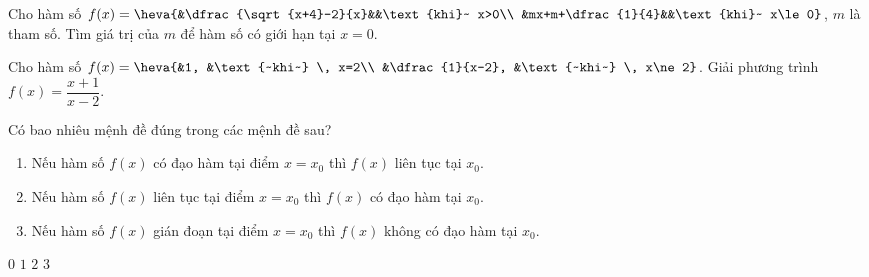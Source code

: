 \begin{ex}%
	 Cho hàm số $f(x)=\heva{&\dfrac{\sqrt{x+4}-2}{x}&&\text{khi}~ x>0\\ &mx+m+\dfrac{1}{4}&&\text{khi}~ x\le 0}$, $m$ là tham số. Tìm giá trị của $m$ để hàm số có giới hạn tại $x=0$.
\end{ex}

\begin{bt}%
	Cho hàm số $f(x)=\heva{&1, &\text{~khi~} \, x=2\\ &\dfrac{1}{x-2}, &\text{~khi~} \, x\ne 2}$.  Giải phương trình $f(x)=\dfrac{x+1}{x-2}$.
\end{bt}

\begin{ex}%
	Có bao nhiêu mệnh đề đúng trong  các mệnh đề sau?
	\begin{enumerate}[(1)]
		\item Nếu hàm số $f(x)$  có đạo hàm tại điểm $x = x_0$ thì $f(x)$ liên tục tại $x_0$.
		\item Nếu hàm số $f(x)$ liên tục tại điểm $x = x_0$ thì $f(x)$ có  đạo hàm tại $x_0$.
		\item  Nếu hàm số $f(x)$ gián đoạn tại điểm $x = x_0$ thì $f(x)$ không có đạo hàm tại $x_0$.
	\end{enumerate}
	\choice 
		{$0$} 
		 {$1$}
		{\True  $2$}
		 {$3$}
\end{ex}

